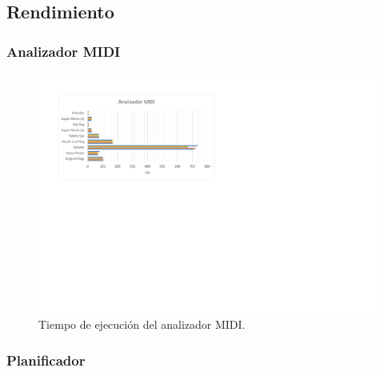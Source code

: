 \smallskip

\subsection{Rendimiento}

\subsubsection{Analizador MIDI}

\smallskip

\begin{figure}[H]
	\noindent \begin{centering}
		\includegraphics[width=\linewidth*3/4]{capitulo6/lat_midi}
		\par\end{centering}
	\smallskip
	\caption{\label{fig:lat_midi} Tiempo de ejecución del analizador MIDI.}
\end{figure} 

\smallskip

\subsubsection{Planificador}

\smallskip

